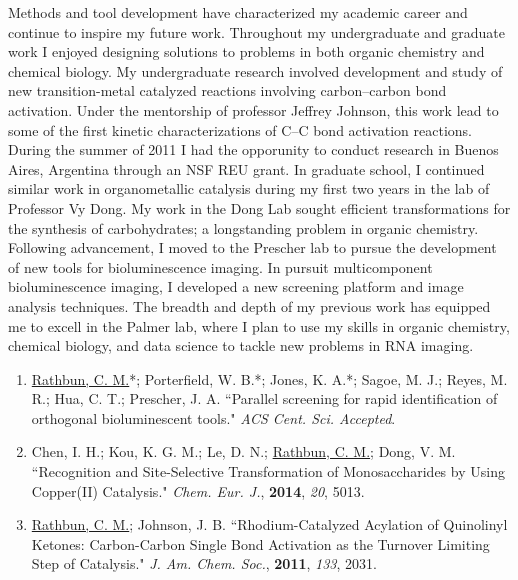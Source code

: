\documentclass{nihbiosketch}
\begin{document}
\begin{statement}
Methods and tool development have characterized my academic career and continue
to inspire my future work. Throughout my undergraduate and graduate work I
enjoyed designing solutions to problems in both organic chemistry and chemical
biology. My undergraduate research involved development and study of new
transition-metal catalyzed reactions involving carbon--carbon bond activation.
Under the mentorship of professor Jeffrey Johnson, this work lead to some of the
first kinetic characterizations of C--C bond activation reactions. During the
summer of 2011 I had the opporunity to conduct research in Buenos Aires,
Argentina through an NSF REU grant. In graduate school, I continued similar work
in organometallic catalysis during my first two years in the lab of Professor Vy
Dong. My work in the Dong Lab sought efficient transformations for the synthesis
of carbohydrates; a longstanding problem in organic chemistry. Following
advancement, I moved to the Prescher lab %
to pursue the development of new tools for bioluminescence imaging. In pursuit
multicomponent bioluminescence imaging, I developed a new screening platform
and image analysis techniques. The breadth and depth of my previous work has
equipped me to excell in the Palmer lab, where I plan to use my skills in
organic chemistry, chemical biology, and data science to tackle new problems in
RNA imaging.

\begin{enumerate} %

  \item \underline{Rathbun, C. M.}*; Porterfield, W. B.*; Jones, K. A.*; Sagoe, M. J.; Reyes, M. R.; Hua, C. T.; Prescher, J. A. ``Parallel screening for rapid identification of orthogonal bioluminescent tools." \textit{ACS Cent. Sci. Accepted}. %

  \item Chen, I. H.; Kou, K. G. M.; Le, D. N.; \underline{Rathbun, C. M.}; Dong, V. M. ``Recognition and Site-Selective Transformation of Monosaccharides by Using Copper(II) Catalysis." \textit{Chem. Eur. J.}, \textbf{2014}, \textit{20}, 5013.

  \item \underline{Rathbun, C. M.}; Johnson, J. B. ``Rhodium-Catalyzed Acylation of Quinolinyl Ketones: Carbon-Carbon Single Bond Activation as the Turnover Limiting Step of Catalysis." \textit{J. Am. Chem. Soc.}, \textbf{2011}, \textit{133}, 2031.

\end{enumerate}

\end{statement}
\end{document}
